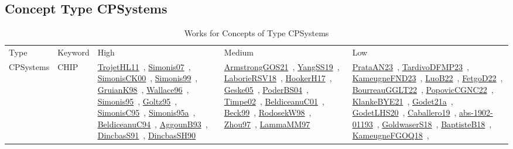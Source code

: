 \clearpage
\subsection{Concept Type CPSystems}
\label{sec:CPSystems}
{\scriptsize
\begin{longtable}{lp{3cm}>{\raggedright\arraybackslash}p{6cm}>{\raggedright\arraybackslash}p{6cm}>{\raggedright\arraybackslash}p{8cm}}
\rowcolor{white}\caption{Works for Concepts of Type CPSystems}\\ \toprule
\rowcolor{white}Type & Keyword & High & Medium & Low\\ \midrule\endhead
\bottomrule
\endfoot
CPSystems & CHIP & \href{../works/TrojetHL11.pdf}{TrojetHL11}~\cite{TrojetHL11}, \href{../works/Simonis07.pdf}{Simonis07}~\cite{Simonis07}, \href{../works/SimonisCK00.pdf}{SimonisCK00}~\cite{SimonisCK00}, \href{../works/Simonis99.pdf}{Simonis99}~\cite{Simonis99}, \href{../works/GruianK98.pdf}{GruianK98}~\cite{GruianK98}, \href{../works/Wallace96.pdf}{Wallace96}~\cite{Wallace96}, \href{../works/Simonis95.pdf}{Simonis95}~\cite{Simonis95}, \href{../works/Goltz95.pdf}{Goltz95}~\cite{Goltz95}, \href{../works/SimonisC95.pdf}{SimonisC95}~\cite{SimonisC95}, \href{../works/Simonis95a.pdf}{Simonis95a}~\cite{Simonis95a}, \href{../works/BeldiceanuC94.pdf}{BeldiceanuC94}~\cite{BeldiceanuC94}, \href{../works/AggounB93.pdf}{AggounB93}~\cite{AggounB93}, \href{../works/DincbasS91.pdf}{DincbasS91}~\cite{DincbasS91}, \href{../works/DincbasSH90.pdf}{DincbasSH90}~\cite{DincbasSH90} & \href{../works/ArmstrongGOS21.pdf}{ArmstrongGOS21}~\cite{ArmstrongGOS21}, \href{../works/YangSS19.pdf}{YangSS19}~\cite{YangSS19}, \href{../works/LaborieRSV18.pdf}{LaborieRSV18}~\cite{LaborieRSV18}, \href{../works/HookerH17.pdf}{HookerH17}~\cite{HookerH17}, \href{../works/Geske05.pdf}{Geske05}~\cite{Geske05}, \href{../works/PoderBS04.pdf}{PoderBS04}~\cite{PoderBS04}, \href{../works/Timpe02.pdf}{Timpe02}~\cite{Timpe02}, \href{../works/BeldiceanuC01.pdf}{BeldiceanuC01}~\cite{BeldiceanuC01}, \href{../works/Beck99.pdf}{Beck99}~\cite{Beck99}, \href{../works/RodosekW98.pdf}{RodosekW98}~\cite{RodosekW98}, \href{../works/Zhou97.pdf}{Zhou97}~\cite{Zhou97}, \href{../works/LammaMM97.pdf}{LammaMM97}~\cite{LammaMM97} & \href{../works/PrataAN23.pdf}{PrataAN23}~\cite{PrataAN23}, \href{../works/TardivoDFMP23.pdf}{TardivoDFMP23}~\cite{TardivoDFMP23}, \href{../works/KameugneFND23.pdf}{KameugneFND23}~\cite{KameugneFND23}, \href{../works/LuoB22.pdf}{LuoB22}~\cite{LuoB22}, \href{../works/FetgoD22.pdf}{FetgoD22}~\cite{FetgoD22}, \href{../works/BourreauGGLT22.pdf}{BourreauGGLT22}~\cite{BourreauGGLT22}, \href{../works/PopovicCGNC22.pdf}{PopovicCGNC22}~\cite{PopovicCGNC22}, \href{../works/KlankeBYE21.pdf}{KlankeBYE21}~\cite{KlankeBYE21}, \href{../works/Godet21a.pdf}{Godet21a}~\cite{Godet21a}, \href{../works/GodetLHS20.pdf}{GodetLHS20}~\cite{GodetLHS20}, \href{../works/Caballero19.pdf}{Caballero19}~\cite{Caballero19}, \href{../works/abs-1902-01193.pdf}{abs-1902-01193}~\cite{abs-1902-01193}, \href{../works/GoldwaserS18.pdf}{GoldwaserS18}~\cite{GoldwaserS18}, \href{../works/BaptisteB18.pdf}{BaptisteB18}~\cite{BaptisteB18}, \href{../works/KameugneFGOQ18.pdf}{KameugneFGOQ18}~\cite{KameugneFGOQ18}, 
\end{longtable}}
